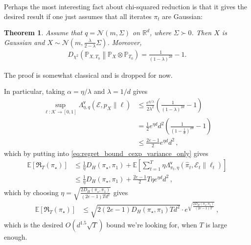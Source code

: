 \documentclass{article}
\theoremstyle{plain}
\newtheorem{theorem}{Theorem}
\theoremstyle{definition}
\theoremstyle{plain}
\newcommand{\Rd}{\mathbb{R}^d}
\newcommand{\Reg}{\mathfrak{R}}
\newcommand{\E}{\mathbb E}
\newcommand{\K}{\mathcal K}
\newcommand{\cN}{\mathcal N}
\newcommand{\PP}{\mathbb P}
\newcommand{\cE}{\mathcal E}
\begin{document}
Perhaps the most interesting fact about chi-squared reduction is that it gives the desired result
if one just assumes that all iterates $\pi_t$ are Gaussian:
\begin{theorem}
    \label{thm:gaussian_chi_squared_control}
    Assume that $q=\cN(m,\Sigma)$ on $\Rd$, where $\Sigma \succ 0$.
    Then $X$ is Gaussian and
    $X
        \sim
        \cN\left(
        m,
        \frac{\lambda}{2-\lambda}\Sigma
        \right)$.
    Moreover,
    \begin{align}
        D_{\chi^2}
        \left(
        \PP_{X,T_0}
        \middle\|
        \PP_X\otimes\PP_{T_0}
        \right)
        =
        \frac{1}{(1-\lambda)^{2d}}-1.
        \label{eq:gaussian_chi_squared_explicit}
    \end{align}
\end{theorem}
\noindent
The proof is somewhat classical and is dropped for now.

In particular, taking $\alpha=\eta/\lambda$ and $\lambda=1/d$ gives
\begin{align}
    \sup_{\ell:\K\to[0,1]}
    \Lambda^{\mathsf{v}}_{\eta,q}(\cE,p_X\|\ell)
     & \le
    \frac{e^{\eta/\lambda}}{2\lambda^2}
    \left(
    \frac{1}{(1-\lambda)^{2d}}-1
    \right) \\
     & =
    \frac12 e^{\eta d} d^2
    \left(
    \frac{1}{(1-\frac{1}{d})^{2d}}-1
    \right) \\
     & \leq
    \frac{2e-1}{2} e^{\eta d} d^2\,,
\end{align}
which by putting into \cref{eq:regret_bound_cexp_variance_only} gives
\begin{align}
    \E[\Reg_T(\pi_\star)]
     & \leq
    \frac{1}{\eta}D_H(\pi_\star,\pi_1)
    +
    \E\left[
        \sum_{t=1}^T
        \eta
        \Lambda^{\mathsf{v}}_{\pi_t, \eta}(\hat{\pi}_t, \cE_t \| \ell_t)
        \right]
    \\
     & \leq
    \frac{1}{\eta}D_H(\pi_\star,\pi_1)
    +
    \frac{2e-1}{2} T\eta e^{\eta d} d^2\,,
\end{align}
which by choosing $\eta = \sqrt{\frac{2D_H(\pi_\star,\pi_1)}{(2e-1)Td^2}}$ gives
\begin{align}
    \E[\Reg_T(\pi_\star)]
     & \leq
    \sqrt{2(2e-1)D_H(\pi_\star,\pi_1)Td^2} \cdot e^{\sqrt{\frac{2D_H(\pi_\star,\pi_1)}{(2e-1)T}}}\,,
\end{align}
which is the desired $O(d^{1.5}\sqrt{T})$ bound we're looking for, when $T$ is large enough.
\end{document}
